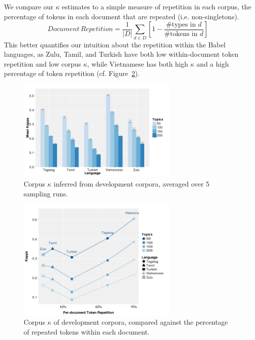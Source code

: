 We compare our $\kappa$ estimates to a simple measure of repetition in each corpus, the percentage of tokens in each document that are repeated (i.e. non-singletons).  
\begin{equation}
Document\,Repetition=\frac{1}{|D|}\sum_{d\in D} \left[ 1-\frac{\text{\# types in }d}{\text{\# tokens in }d}\right]
\end{equation}This better quantifies our intuition about the repetition within the Babel languages, as Zulu, Tamil, and Turkish have both low within-document token repetition and low corpus $\kappa$, while Vietnamese has both high $\kappa$ and a high percentage of token repetition (cf. Figure~\ref{fig6:docRep}).
\begin{figure}
\begin{center}
\includegraphics[width=0.7\textwidth]{graphs/ch6/kappas-dev.png}
\end{center}
\caption[Corpus $\kappa$ inferred from development corpora]{Corpus $\kappa$ inferred from development corpora, averaged over 5 sampling runs.\label{fig6:devKappa}}
\end{figure}
\begin{figure}
\begin{center}
\includegraphics[width=0.7\textwidth]{graphs/ch6/docRep.png}
\end{center}
\caption[Corpus $\kappa$ and per-document token repetition]{Corpus $\kappa$ of development corpora, compared against the percentage of repeated tokens within each document. \label{fig6:docRep}}
\end{figure}

